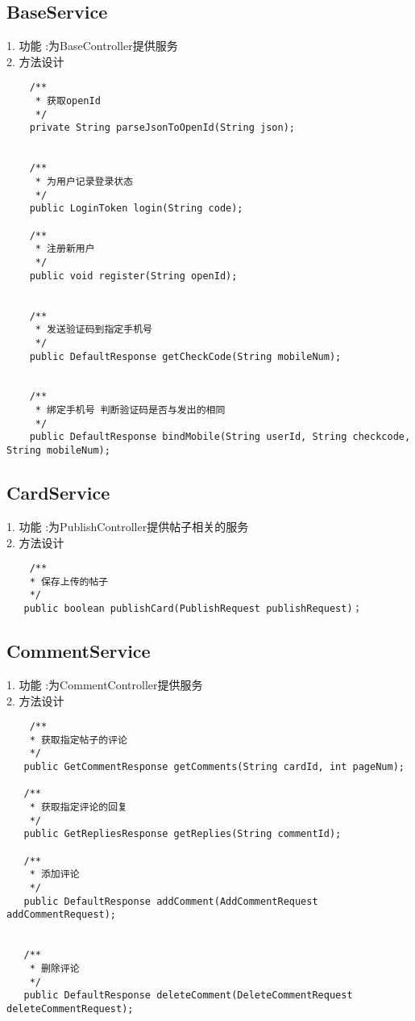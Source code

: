 \subsection{BaseService}
1. 功能 :为BaseController提供服务 \\
2. 方法设计
\begin{lstlisting}
    /**
     * 获取openId
     */
    private String parseJsonToOpenId(String json);


    /**
     * 为用户记录登录状态
     */
    public LoginToken login(String code);

    /**
     * 注册新用户
     */
    public void register(String openId);


    /**
     * 发送验证码到指定手机号
     */
    public DefaultResponse getCheckCode(String mobileNum);


    /**
     * 绑定手机号 判断验证码是否与发出的相同
     */
    public DefaultResponse bindMobile(String userId, String checkcode, String mobileNum);
\end{lstlisting}

\subsection{CardService}
1. 功能 :为PublishController提供帖子相关的服务 \\
2. 方法设计
\begin{lstlisting}
    /**
    * 保存上传的帖子
    */
   public boolean publishCard(PublishRequest publishRequest)；
\end{lstlisting}

\subsection{CommentService}
1. 功能 :为CommentController提供服务 \\
2. 方法设计
\begin{lstlisting}
    /**
    * 获取指定帖子的评论
    */
   public GetCommentResponse getComments(String cardId, int pageNum);

   /**
    * 获取指定评论的回复
    */
   public GetRepliesResponse getReplies(String commentId);

   /**
    * 添加评论
    */
   public DefaultResponse addComment(AddCommentRequest addCommentRequest);


   /**
    * 删除评论
    */
   public DefaultResponse deleteComment(DeleteCommentRequest deleteCommentRequest);
\end{lstlisting}

